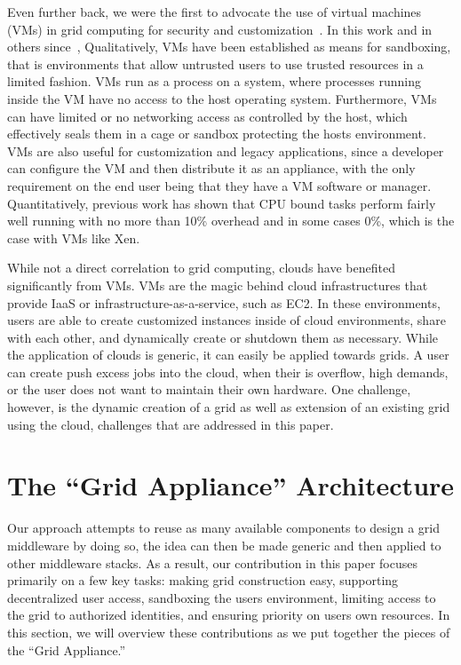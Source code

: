 \documentclass[conference]{IEEEtran}
\begin{document}
Even further back, we were the first to advocate the use of virtual machines
(VMs) in grid computing for security and
customization~\cite{case_for_grid_computing_on_vms}.  In this work and in
others since~\cite{sandbox, swan, sandbox1}, Qualitatively, VMs have been
established as means for sandboxing, that is environments that allow untrusted
users to use trusted resources in a limited fashion.  VMs run as a process on a
system, where processes running inside the VM have no access to the host
operating system.  Furthermore, VMs can have limited or no networking access as
controlled by the host, which effectively seals them in a cage or sandbox
protecting the hosts environment.  VMs are also useful for customization and
legacy applications, since a developer can configure the VM and then distribute
it as an appliance, with the only requirement on the end user being that they
have a VM software or manager.  Quantitatively, previous work has shown that
CPU bound tasks perform fairly well running with no more than 10\% overhead and
in some cases 0\%, which is the case with VMs like Xen.

While not a direct correlation to grid computing, clouds have benefited
significantly from VMs.  VMs are the magic behind cloud infrastructures that
provide IaaS or infrastructure-as-a-service, such as EC2.  In these
environments, users are able to create customized instances inside of cloud
environments, share with each other, and dynamically create or shutdown them as
necessary.  While the application of clouds is generic, it can easily be
applied towards grids.  A user can create push excess jobs into the cloud, when
their is overflow, high demands, or the user does not want to maintain their
own hardware.  One challenge, however, is the dynamic creation of a grid as
well as extension of an existing grid using the cloud, challenges that are
addressed in this paper.

\section{The ``Grid Appliance'' Architecture}
\label{architecture}

Our approach attempts to reuse as many available components to design a grid
middleware by doing so, the idea can then be made generic and then applied to
other middleware stacks.  As a result, our contribution in this paper focuses
primarily on a few key tasks:  making grid construction easy, supporting
decentralized user access, sandboxing the users environment, limiting access to
the grid to authorized identities, and ensuring priority on users own
resources.  In this section, we will overview these contributions as we put
together the pieces of the ``Grid Appliance.''
\end{document}
